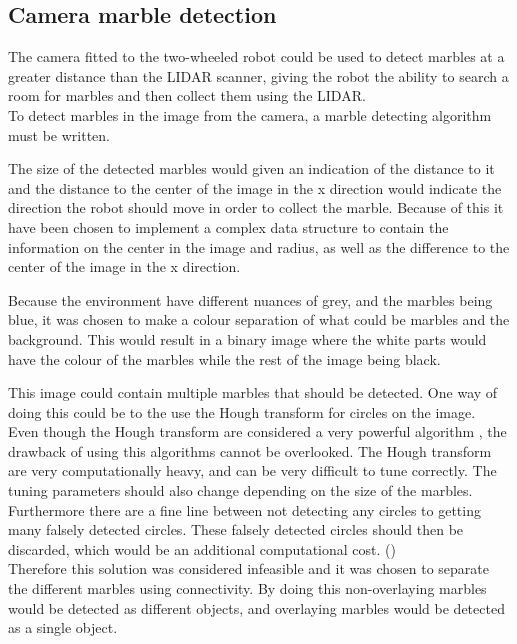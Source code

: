 \documentclass[../Head/Main.tex]{subfiles}
\begin{document}
\subsection{Camera marble detection}
The camera fitted to the two-wheeled robot could be used to detect marbles at a greater distance than the LIDAR scanner, giving the robot the ability to search a room for marbles and then collect them using the LIDAR.\\
To detect marbles in the image from the camera, a marble detecting algorithm must be written.\par 

The size of the detected marbles would given an indication of the distance to it and the distance to the center of the image in the x direction would indicate the direction the robot should move in order to collect the marble. Because of this it have been chosen to implement a complex data structure to contain the information on the center in the image and radius, as well as the difference to the center of the image in the x direction.\par 

Because the environment have different nuances of grey, and the marbles being blue, it was chosen to make a colour separation of what could be marbles and the background. This would result in a binary image where the white parts would have the colour of the marbles while the rest of the image being black.\par 
This image could contain multiple marbles that should be detected. One way of doing this could be to the use the Hough transform for circles on the image.\\
Even though the Hough transform are considered a very powerful algorithm , the drawback of using this algorithms cannot be overlooked. The Hough transform are very computationally heavy, and can be very difficult to tune correctly. The tuning parameters should also change depending on the size of the marbles. Furthermore there are a fine line between not detecting any circles to getting many falsely detected circles. These falsely detected circles should then be discarded, which would be an additional computational cost. (\cite[p.108-112]{OCV})\\
Therefore this solution was considered infeasible and it was chosen to separate the different marbles using connectivity. By doing this non-overlaying marbles would be detected as different objects, and overlaying marbles would be detected as a single object. \par 
\end{document}
